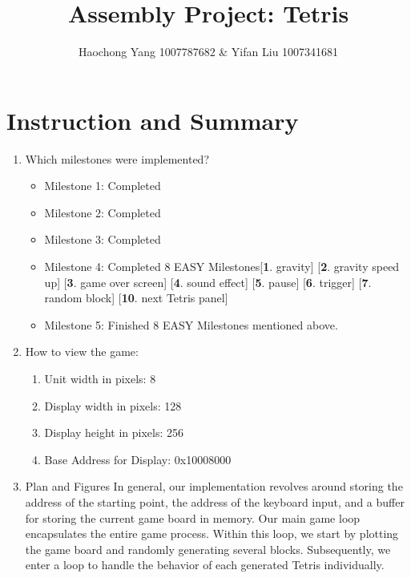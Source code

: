 \documentclass{article}
\title{Assembly Project: Tetris}
\author{Haochong Yang 1007787682 & Yifan Liu 1007341681}
\begin{document}
\maketitle

\section{Instruction and Summary}

\begin{enumerate}

    \item Which milestones were implemented?

    \begin{itemize}
        \item Milestone 1: Completed
        \item Milestone 2: Completed
        \item Milestone 3: Completed
        \item Milestone 4: Completed 8 EASY Milestones[\textbf{1}. gravity] [\textbf{2}. gravity speed up] [\textbf{3}. game over screen] [\textbf{4}. sound effect] [\textbf{5}. pause] [\textbf{6}. trigger] [\textbf{7}. random block]  [\textbf{10}. next Tetris panel]
        \item Milestone 5: Finished 8 EASY Milestones mentioned above.
    \end{itemize}

    \item How to view the game:
    
    \begin{enumerate}

    \item Unit width in pixels: 8
    \item Display width in pixels: 128
    \item Display height in pixels: 256
    \item Base Address for Display: 0x10008000


    \end{enumerate}

\item Plan and Figures
In general, our implementation revolves around storing the address of the starting point, the address of the keyboard input, and a buffer for storing the current game board in memory. Our main game loop encapsulates the entire game process. Within this loop, we start by plotting the game board and randomly generating several blocks. Subsequently, we enter a loop to handle the behavior of each generated Tetris individually.


\end{enumerate}
\end{document}
